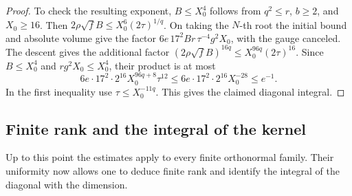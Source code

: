 \begin{proof}
  To check the resulting exponent, \(B\le X_0^4\) follows
  from \(q^2\le r\), \(b\ge2\), and \(X_0\ge16\).
  Then \(2\rho\sqrt f B\le X_0^6(2\tau)^{1/q}\).
  On taking the \(N\)-th root the initial bound and absolute
  volume give the factor
  \(6e\,17^2 B r\,\tau^{-4}g^2X_0\), with the gauge
  canceled. The descent gives the additional factor
  \((2\rho\sqrt f B)^{16q}\le
  X_0^{96q}(2\tau)^{16}\). Since \(B\le X_0^4\) and
  \(r g^2 X_0\le X_0^4\), their product is at most
  \[
     6e\cdot17^2\cdot 2^{16}X_0^{96q+8}\tau^{12}
       \le 6e\cdot17^2\cdot 2^{16}X_0^{-28}
       \le e^{-1}.
  \]
  In the first inequality use \(\tau\le X_0^{-11q}\).
  This gives the claimed diagonal integral.
\end{proof}

\subsection{Finite rank and the integral of the kernel}

Up to this point the estimates apply to every finite orthonormal family. Their uniformity now allows one to deduce finite rank and identify the integral of the diagonal with the dimension.


